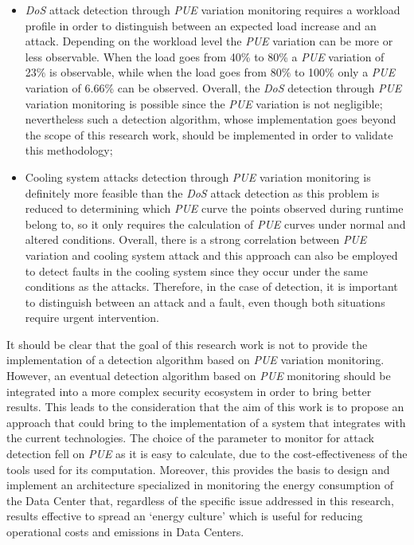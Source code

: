 \begin{itemize}
    \item \emph{DoS} attack detection through \emph{PUE} variation monitoring requires a workload profile in order to distinguish between an expected load increase and an attack. Depending on the workload level the \emph{PUE} variation can be more or less observable. When the load goes from 40\% to 80\% a \emph{PUE} variation of 23\% is observable, while when the load goes from 80\% to 100\% only a \emph{PUE} variation of 6.66\% can be observed. Overall, the \emph{DoS} detection through \emph{PUE} variation monitoring is possible since the \emph{PUE} variation is not negligible; nevertheless such a detection algorithm, whose implementation goes beyond the scope of this research work, should be implemented in order to validate this methodology;
    \item Cooling system attacks detection through \emph{PUE} variation monitoring is definitely more feasible than the \emph{DoS} attack detection as this problem is reduced to determining which \emph{PUE} curve the points observed during runtime belong to, so it only requires the calculation of \emph{PUE} curves under normal and altered conditions. Overall, there is a strong correlation between \emph{PUE} variation and cooling system attack and this approach can also be employed to detect faults in the cooling system since they occur under the same conditions as the attacks. Therefore, in the case of detection, it is important to distinguish between an attack and a fault, even though both situations require urgent intervention. 
\end{itemize}
It should be clear that the goal of this research work is not to provide the implementation of a detection algorithm based on \emph{PUE} variation monitoring. However, an eventual detection algorithm based on \emph{PUE} monitoring should be integrated into a more complex security ecosystem in order to bring better results. This leads to the consideration that the aim of this work is to propose an approach that could bring to the implementation of a system that integrates with the current technologies. The choice of the parameter to monitor for attack detection fell on \emph{PUE} as it is easy to calculate, due to the cost-effectiveness of the tools used for its computation. Moreover, this provides the basis to design and implement an architecture specialized in monitoring the energy consumption of the Data Center that, regardless of the specific issue addressed in this research, results effective to spread an `energy culture' which is useful for reducing operational costs and emissions in Data Centers. 
